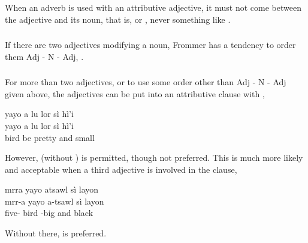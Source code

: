 \subsubsection{} When an adverb is used with an attributive adjective,
it must not come between the adjective and its noun, that is,
  or
, never something like .

\subsubsection{} If there are two adjectives modifying a noun, Frommer
has a tendency to order them Adj - N - Adj,  . 

\subsubsection{} For more than two adjectives, or to use some order
other than  Adj - N - Adj given above, the adjectives can be put
into an attributive clause with ,

\begin{interlin}
\glll yayo a lu lor sì hì'i \\
      yayo a lu lor sì hì'i \\
      bird  be pretty and small \\
 \Ipawl{}
\end{interlin}

\noindent However,  (without ) is permitted,
though not preferred.  This is much more likely and acceptable when a
third adjective is involved in the clause,

\begin{interlin}
\glll mrra yayo atsawl sì layon \\
      mrr-a yayo a-tsawl sì layon \\
      five- bird -big and black \\
 \Ipawl{}
\end{interlin}

\noindent Without  there,  is preferred. 

